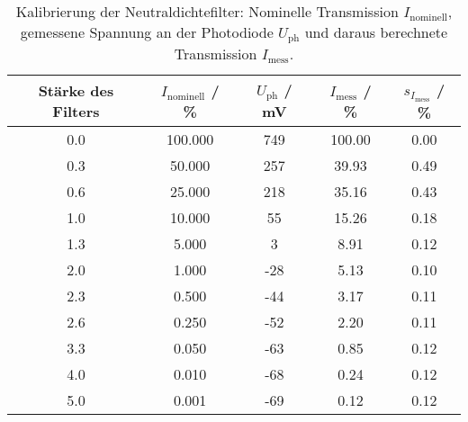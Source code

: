 \begin{table}[H]
\caption{Kalibrierung der Neutraldichtefilter: Nominelle Transmission $I_{\text{nominell}}$, gemessene Spannung an der Photodiode $U_{\text{ph}}$ und daraus berechnete Transmission $I_{\text{mess}}$. }
\begin{center}
\begin{tabular}{|c|c|c|c|c|}
  \hline
  Stärke des Filters & $I_\text{nominell}$ / \% & $U_\text{ph}$ / mV & $I_\text{mess}$ / \% & $s_{I_\text{mess}}$ / \% \\ \hline
  0.0 & 100.000 & 749 & 100.00 & 0.00 \\ \hline
  0.3 & 50.000 & 257 & 39.93 & 0.49 \\ \hline
  0.6 & 25.000 & 218 & 35.16 & 0.43 \\ \hline
  1.0 & 10.000 & 55 & 15.26 & 0.18 \\ \hline
  1.3 & 5.000 & 3 & 8.91 & 0.12 \\ \hline
  2.0 & 1.000 & -28 & 5.13 & 0.10 \\ \hline
  2.3 & 0.500 & -44 & 3.17 & 0.11 \\ \hline
  2.6 & 0.250 & -52 & 2.20 & 0.11 \\ \hline
  3.3 & 0.050 & -63 & 0.85 & 0.12 \\ \hline
  4.0 & 0.010 & -68 & 0.24 & 0.12 \\ \hline
  5.0 & 0.001 & -69 & 0.12 & 0.12 \\ \hline
\end{tabular}
\end{center}
\label{tab:deh:dnfilter}
\end{table}
